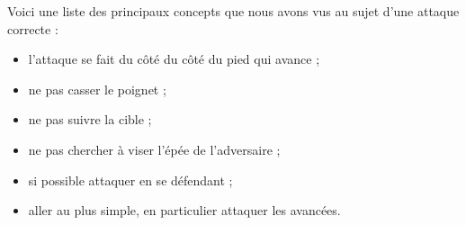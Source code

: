 \noindent
Voici une liste des principaux concepts que nous avons vus au sujet d'une attaque correcte :
\begin{itemize}
	\item l'attaque se fait du côté du côté du pied qui avance ;
	\item ne pas casser le poignet ;
	\item ne pas suivre la cible ;
	\item ne pas chercher à viser l'épée de l'adversaire ;
	\item si possible attaquer en se défendant ;
	\item aller au plus simple, en particulier attaquer les avancées.
\end{itemize}

